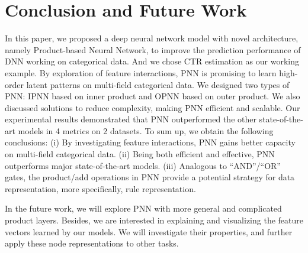 \documentclass[conference]{IEEEtran}
\begin{document}
\section{Conclusion and Future Work}\label{sec:conclusion}
In this paper, we proposed a deep neural network model with novel architecture, namely Product-based Neural Network, to improve the prediction performance of DNN working on categorical data. And we chose CTR estimation as our working example. By exploration of feature interactions, PNN
is promising to learn high-order latent patterns on multi-field categorical data.
We designed two types of PNN: IPNN based on inner product and OPNN based on outer product. We also discussed solutions to reduce complexity, making PNN efficient and scalable. Our experimental results demonstrated that PNN outperformed the other state-of-the-art models in 4 metrics on 2 datasets. To sum up, we obtain the following conclusions: (i)
By investigating feature interactions, PNN gains better capacity on multi-field categorical data. (ii) Being both efficient and effective, PNN outperforms major state-of-the-art models. (iii)
Analogous to ``AND''/``OR'' gates, the product/add operations in PNN
provide a potential strategy for data representation, more specifically, rule representation.

In the future work, we will explore PNN with more general and complicated product layers. Besides, we are interested in explaining and visualizing the feature vectors learned by our models. We will investigate their properties, and further apply these node representations to other tasks.








\end{document}
